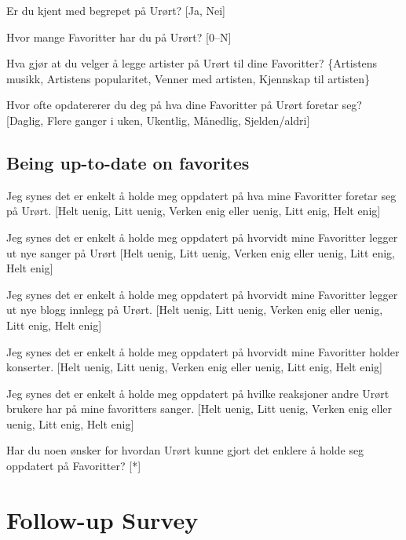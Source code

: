 \begin{enum}
  \item * Er du kjent med begrepet  på Urørt?
    [Ja, Nei]
  \item Hvor mange Favoritter har du på Urørt?
    [0--N]
  \item Hva gjør at du velger å legge artister på Urørt til dine Favoritter?
    \{Artistens musikk, Artistens popularitet, Venner med artisten,
    Kjennskap til artisten\}
  \item  Hvor ofte opdatererer du deg på hva dine Favoritter på Urørt
    foretar seg?
    [Daglig, Flere ganger i uken, Ukentlig, Månedlig, Sjelden/aldri]
\end{enum}

\subsection{Being up-to-date on favorites}

\begin{enum}
  \item Jeg synes det er enkelt å holde meg oppdatert på
    hva mine Favoritter foretar seg på Urørt.
    [Helt uenig, Litt uenig, Verken enig eller uenig, Litt enig, Helt enig]
  \item Jeg synes det er enkelt å holde meg oppdatert på
    hvorvidt mine Favoritter legger ut nye sanger på Urørt
    [Helt uenig, Litt uenig, Verken enig eller uenig, Litt enig, Helt enig]
  \item Jeg synes det er enkelt å holde meg oppdatert på
    hvorvidt mine Favoritter legger ut nye blogg innlegg på Urørt.
    [Helt uenig, Litt uenig, Verken enig eller uenig, Litt enig, Helt enig]
  \item Jeg synes det er enkelt å holde meg oppdatert på
    hvorvidt mine Favoritter holder konserter.
    [Helt uenig, Litt uenig, Verken enig eller uenig, Litt enig, Helt enig]
  \item Jeg synes det er enkelt å holde meg oppdatert på
    hvilke reaksjoner andre Urørt brukere har på mine favoritters sanger.
    [Helt uenig, Litt uenig, Verken enig eller uenig, Litt enig, Helt enig]
  \item Har du noen ønsker for hvordan Urørt kunne gjort det enklere å holde
    seg oppdatert på Favoritter? [*]
\end{enum}


\section{Follow-up Survey}

